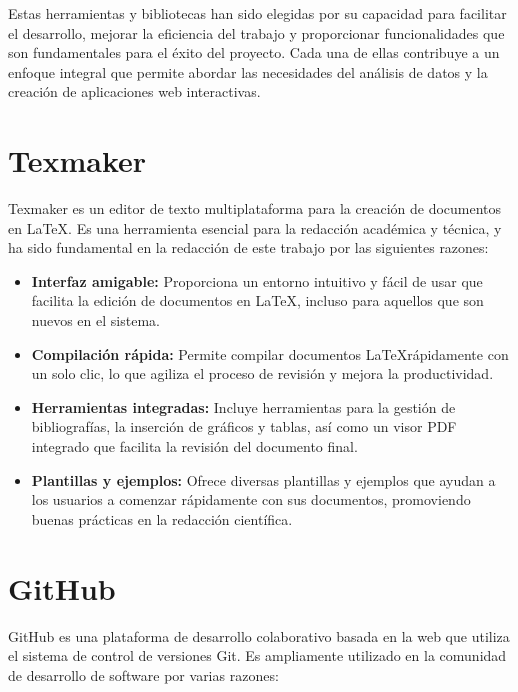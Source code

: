 Estas herramientas y bibliotecas han sido elegidas por su capacidad para facilitar el desarrollo, mejorar la eficiencia del trabajo y proporcionar funcionalidades que son fundamentales para el éxito del proyecto. Cada una de ellas contribuye a un enfoque integral que permite abordar las necesidades del análisis de datos y la creación de aplicaciones web interactivas.


\section{Texmaker}
Texmaker es un editor de texto multiplataforma para la creación de documentos en \LaTeX. Es una herramienta esencial para la redacción académica y técnica, y ha sido fundamental en la redacción de este trabajo por las siguientes razones:

\begin{itemize}
    \item \textbf{Interfaz amigable:} Proporciona un entorno intuitivo y fácil de usar que facilita la edición de documentos en \LaTeX, incluso para aquellos que son nuevos en el sistema.
    \item \textbf{Compilación rápida:} Permite compilar documentos \LaTeX rápidamente con un solo clic, lo que agiliza el proceso de revisión y mejora la productividad.
    \item \textbf{Herramientas integradas:} Incluye herramientas para la gestión de bibliografías, la inserción de gráficos y tablas, así como un visor PDF integrado que facilita la revisión del documento final.
    \item \textbf{Plantillas y ejemplos:} Ofrece diversas plantillas y ejemplos que ayudan a los usuarios a comenzar rápidamente con sus documentos, promoviendo buenas prácticas en la redacción científica.
\end{itemize}


\section{GitHub}
GitHub es una plataforma de desarrollo colaborativo basada en la web que utiliza el sistema de control de versiones Git. Es ampliamente utilizado en la comunidad de desarrollo de software por varias razones:

